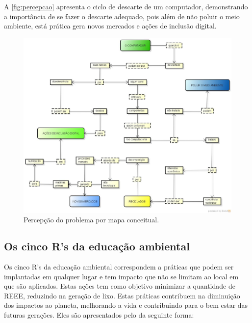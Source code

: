 A \autoref{fig:percepcao} apresenta o ciclo de descarte de um computador, demonstrando a importância de se fazer o descarte adequado, pois além de não poluir o meio ambiente, está prática gera novos mercados e ações de inclusão digital.

\begin{figure}[htb]
	\caption{\label{fig:percepcao}Percepção do problema por mapa conceitual.}
	\begin{center}
	    \includegraphics[scale=0.35]{imagens/percepcao-problema.jpg}
	\end{center}
\end{figure}

\subsection{Os cinco R's da educação ambiental}

Os cinco R’s da educação ambiental correspondem a práticas que podem ser implantadas em qualquer lugar e tem impacto que não se limitam ao local em que são aplicados. Estas ações tem como objetivo minimizar a quantidade de REEE, reduzindo na geração de lixo. Estas práticas contribuem na diminuição dos impactos ao planeta, melhorando a vida e contribuindo para o bem estar das futuras gerações. Eles são apresentados pelo  da seguinte forma:

